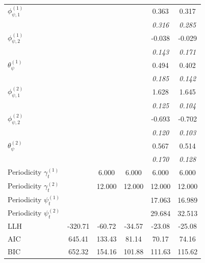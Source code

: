 \begin{table}[t!]
\begin{tabular}{lccccc}
$\phi_{\psi,1}^{(1)}$ &  &  &  & 0.363 & 0.317 \\
 &  &  &  & {\footnotesize\textit{0.316}} & {\footnotesize\textit{0.285}} \\
$\phi_{\psi,2}^{(1)}$ &  &  &  & -0.038 & -0.029 \\
 &  &  &  & {\footnotesize\textit{0.143}} & {\footnotesize\textit{0.171}} \\
$\theta_{\psi}^{(1)}$ &  &  &  & 0.494 & 0.402 \\
 &  &  &  & {\footnotesize\textit{0.185}} & {\footnotesize\textit{0.142}} \\
$\phi_{\psi,1}^{(2)}$ &  &  &  & 1.628 & 1.645 \\
 &  &  &  & {\footnotesize\textit{0.125}} & {\footnotesize\textit{0.104}} \\
$\phi_{\psi,2}^{(2)}$ &  &  &  & -0.693 & -0.702 \\
 &  &  &  & {\footnotesize\textit{0.120}} & {\footnotesize\textit{0.103}} \\
$\theta_{\psi}^{(2)}$ &  &  &  & 0.567 & 0.514 \\
 &  &  &  & {\footnotesize\textit{0.170}} & {\footnotesize\textit{0.128}} \\
\midrule
Periodicity $\gamma_t^{(1)}$ &  & 6.000 & 6.000 & 6.000 & 6.000 \\
Periodicity $\gamma_t^{(2)}$ &  & 12.000 & 12.000 & 12.000 & 12.000 \\
Periodicity $\psi_t^{(1)}$ &  &  &  & 17.063 & 16.989 \\
Periodicity $\psi_t^{(2)}$ &  &  &  & 29.684 & 32.513 \\
\midrule
LLH & -320.71 & -60.72 & -34.57 & -23.08 & -25.08 \\
AIC & 645.41 & 133.43 & 81.14 & 70.17 & 74.16 \\
BIC & 652.32 & 154.16 & 101.88 & 111.63 & 115.62 \\
\bottomrule
\end{tabular}
\end{table}
